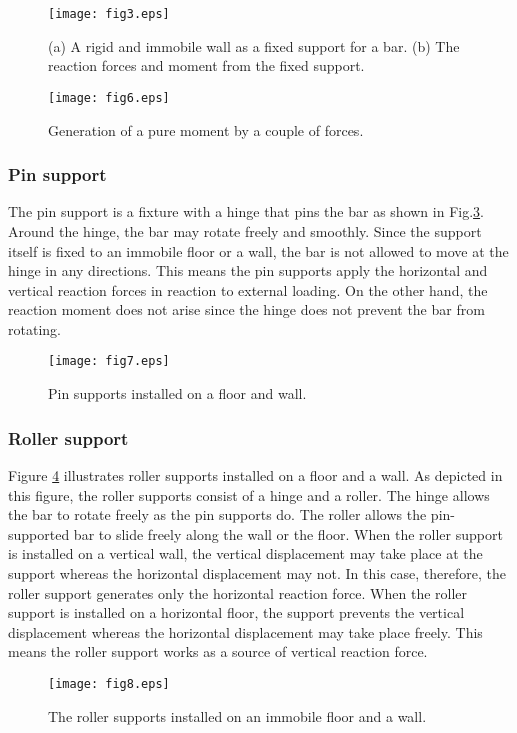 ﻿\documentclass[10pt,a4j]{article}
\begin{document}
\begin{figure}[h]
	\begin{center}
	\texttt{[image: fig3.eps]} 
	\end{center}
	\caption{(a) A rigid and immobile wall as a fixed support for a bar. 
	(b) The reaction forces and moment from the fixed support.} 
	\label{fig:fig3}
\end{figure}
\begin{figure}[h]
	\begin{center}
	\texttt{[image: fig6.eps]} 
	\end{center}
	\caption{Generation of a pure moment by a couple of forces.} 
	\label{fig:fig6}
\end{figure}
\subsubsection{Pin support}
The pin support is a fixture with a hinge that pins the bar as shown in Fig.\ref{fig:fig7}. 
Around the hinge, the bar may rotate freely and smoothly. 
Since the support itself is fixed to an immobile floor or a wall, the bar is not allowed to move at the hinge in any directions.  
This means the pin supports apply the horizontal and vertical reaction forces in reaction to external loading. 
On the other hand, the reaction moment does not arise since the hinge does not prevent the bar from rotating. 
\begin{figure}[h]
	\begin{center}
	\texttt{[image: fig7.eps]} 
	\end{center}
	\caption{Pin supports installed on a floor and wall.} 
	\label{fig:fig7}
\end{figure}
\subsubsection{Roller support}
Figure \ref{fig:fig8} illustrates roller supports installed on a floor and a wall. 
As depicted in this figure, the roller supports consist of a hinge and a roller. 
The hinge allows the bar to rotate freely as the pin supports do. 
The roller allows the pin-supported bar to slide freely along the wall or the floor. 
When the roller support is installed on a vertical wall, the vertical displacement may take place at the support whereas  the horizontal displacement may not. In this case, therefore, the roller support generates only the horizontal reaction force. 
When the roller support is installed on a horizontal floor, the support prevents the vertical displacement whereas the horizontal displacement may take place freely. This means the roller support works as a source of vertical reaction force.
\begin{figure}[h]
	\begin{center}
	\texttt{[image: fig8.eps]} 
	\end{center}
	\caption{The roller supports installed on an immobile floor and a wall.} 
	\label{fig:fig8}
\end{figure}
\end{document}

